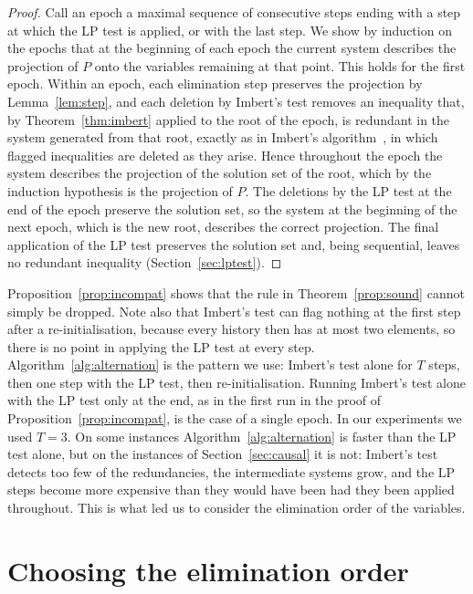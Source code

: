 \documentclass[11pt]{article}
\theoremstyle{definition}
\begin{document}
\begin{proof}
Call an epoch a maximal sequence of consecutive steps ending with a step at which the LP test is applied, or with the last step. We show by induction on the epochs that at the beginning of each epoch the current system describes the projection of $P$ onto the variables remaining at that point. This holds for the first epoch. Within an epoch, each elimination step preserves the projection by Lemma~\ref{lem:step}, and each deletion by Imbert's test removes an inequality that, by Theorem~\ref{thm:imbert} applied to the root of the epoch, is redundant in the system generated from that root, exactly as in Imbert's algorithm~\cite{imbert1990}, in which flagged inequalities are deleted as they arise. Hence throughout the epoch the system describes the projection of the solution set of the root, which by the induction hypothesis is the projection of $P$. The deletions by the LP test at the end of the epoch preserve the solution set, so the system at the beginning of the next epoch, which is the new root, describes the correct projection. The final application of the LP test preserves the solution set and, being sequential, leaves no redundant inequality (Section~\ref{sec:lptest}).
\end{proof}

Proposition~\ref{prop:incompat} shows that the rule in Theorem~\ref{prop:sound} cannot simply be dropped. Note also that Imbert's test can flag nothing at the first step after a re-initialisation, because every history then has at most two elements, so there is no point in applying the LP test at every step. Algorithm~\ref{alg:alternation} is the pattern we use: Imbert's test alone for $T$ steps, then one step with the LP test, then re-initialisation. Running Imbert's test alone with the LP test only at the end, as in the first run in the proof of Proposition~\ref{prop:incompat}, is the case of a single epoch. In our experiments we used $T=3$. On some instances Algorithm~\ref{alg:alternation} is faster than the LP test alone, but on the instances of Section~\ref{sec:causal} it is not: Imbert's test detects too few of the redundancies, the intermediate systems grow, and the LP steps become more expensive than they would have been had they been applied throughout. This is what led us to consider the elimination order of the variables.

\section{Choosing the elimination order}
\label{sec:order}
\end{document}

